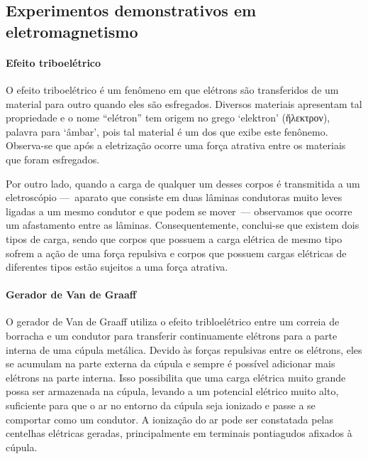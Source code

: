 \subsection{Experimentos demonstrativos em eletromagnetismo}

\paragraph{Efeito triboelétrico}

O efeito triboelétrico é um fenômeno em que elétrons são transferidos de um material para outro quando eles são esfregados. Diversos materiais apresentam tal propriedade e o nome ``elétron'' tem origem no grego `elektron' (ἤλεκτρον), palavra para `âmbar', pois tal material é um dos que exibe este fenônemo. Observa-se que após a eletrização ocorre uma força atrativa entre os materiais que foram esfregados.

Por outro lado, quando a carga de qualquer um desses corpos é transmitida a um eletroscópio ---~aparato que consiste em duas lâminas condutoras muito leves ligadas a um mesmo condutor e que podem se mover~--- observamos que ocorre um afastamento entre as lâminas. Consequentemente, conclui-se que existem dois tipos de carga, sendo que corpos que possuem a carga elétrica de mesmo tipo sofrem a ação de uma força repulsiva e corpos que possuem cargas elétricas de diferentes tipos estão sujeitos a uma força atrativa.

\paragraph{Gerador de Van de Graaff}

O gerador de Van de Graaff utiliza o efeito tribloelétrico entre um correia de borracha e um condutor para transferir continuamente elétrons para a parte interna de uma cúpula metálica. Devido às forças repulsivas entre os elétrons, eles se acumulam na parte externa da cúpula e sempre é possível adicionar mais elétrons na parte interna. Isso possibilita que uma carga elétrica muito grande possa ser armazenada na cúpula, levando a um potencial elétrico muito alto, suficiente para que o ar no entorno da cúpula seja ionizado e passe a se comportar como um condutor. A ionização do ar pode ser constatada pelas centelhas elétricas geradas, principalmente em terminais pontiagudos afixados à cúpula.

